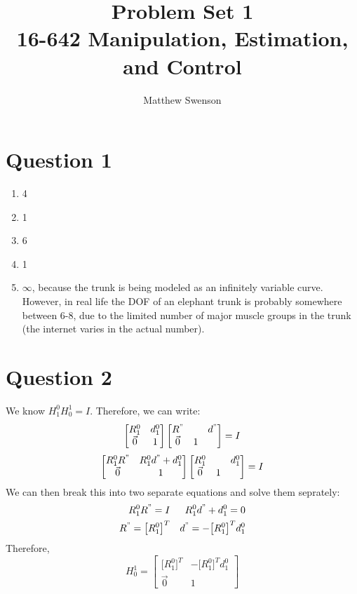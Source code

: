 \documentclass[11pt]{article}
\title{Problem Set 1\\ \vspace{2mm}\Large{16-642 Manipulation, Estimation, and Control}}
\author{Matthew Swenson}
\begin{document}
	\maketitle
	
\section{Question 1}
\begin{enumerate}[label=\Alph*]
    \item 4
    \item 1
    \item 6
    \item 1
    \item $\infty$, because the trunk is being modeled as an infinitely variable curve. However, in real life the DOF of an elephant trunk is probably somewhere between 6-8, due to the limited number of major muscle groups in the trunk (the internet varies in the actual number). 
\end{enumerate}
\section{Question 2}
We know $H^0_1 H^1_0 = I$. Therefore, we can write: 
$$
\begin{bmatrix}
    R^0_1  & d^0_1  \\
    \vec{0} & 1
\end{bmatrix}
\begin{bmatrix}
    R^"& & d^"  \\
    \vec{0} & 1
\end{bmatrix}
=
I
$$
$$
\begin{bmatrix}
    R^0_1R^"& R^0_1d^"+d^0_1  \\
    \vec{0} & 1
\end{bmatrix}
\begin{bmatrix}
    R^0_1& & d^0_1  \\
    \vec{0} & 1
\end{bmatrix}
=
I
$$
We can then break this into two separate equations and solve them seprately: 
\begin{align*}
R^0_1R^" = I 
&&
R^0_1d^"+d^0_1  = 0 
\\
R^" = \big[R^0_1\big]^T 
&& 
d^"= -\big[R^0_1\big]^T  d^0_1  
\end{align*}
Therefore,
$$
H^1_0 =
\begin{bmatrix}
    \big[R^0_1\big]^{ T} & -\big[R^0_1\big]^{T } d^0_1  \\
    \vec{0}& 1
\end{bmatrix}
$$
\end{document}
